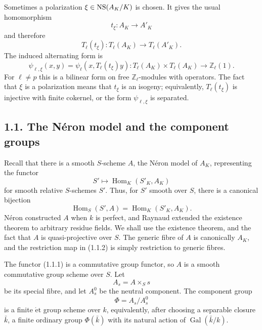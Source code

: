 \documentclass[11pt]{article}
\providecommand{\Gal}{\operatorname{Gal}}
\providecommand{\Z}{\mathbb Z}
\providecommand{\etale}{\mathrm{\acute et}}
\providecommand{\Hom}{\operatorname{Hom}}
\begin{document}
Sometimes a polarization \(\xi\in\operatorname{NS}(A_K/K)\) is chosen.  It gives the usual homomorphism
\begin{equation}\tag{1.0.5}
 t_\xi:A_K\longrightarrow A'_K
\end{equation}
and therefore
\begin{equation}\tag{1.0.6}
 T_\ell(t_\xi):T_\ell(A_K)\longrightarrow T_\ell(A'_K).
\end{equation}
The induced alternating form is
\begin{equation}\tag{1.0.7}
 \psi_{\ell,\xi}(x,y)=\psi_\ell(x,T_\ell(t_\xi)y):T_\ell(A_K)\times T_\ell(A_K)\longrightarrow \Z_\ell(1).
\end{equation}
For \(\ell\ne p\) this is a bilinear form on free \(\Z_\ell\)-modules with operators.  The fact that \(\xi\) is a polarization means that \(t_\xi\) is an isogeny; equivalently, \(T_\ell(t_\xi)\) is injective with finite cokernel, or the form \(\psi_{\ell,\xi}\) is separated.

\subsection*{1.1. The N\'eron model and the component groups}
Recall that there is a smooth \(S\)-scheme \(A\), the N\'eron model of \(A_K\), representing the functor
\begin{equation}\tag{1.1.1}
 S'\longmapsto \Hom_K(S'_K,A_K)
\end{equation}
for smooth relative \(S\)-schemes \(S'\).  Thus, for \(S'\) smooth over \(S\), there is a canonical bijection
\begin{equation}\tag{1.1.2}
 \Hom_S(S',A)=\Hom_K(S'_K,A_K).
\end{equation}
N\'eron constructed \(A\) when \(k\) is perfect, and Raynaud extended the existence theorem to arbitrary residue fields.  We shall use the existence theorem, and the fact that \(A\) is quasi-projective over \(S\).  The generic fibre of \(A\) is canonically \(A_K\), and the restriction map in (1.1.2) is simply restriction to generic fibres.

The functor (1.1.1) is a commutative group functor, so \(A\) is a smooth commutative group scheme over \(S\).  Let
\begin{equation}\tag{1.1.4}
 A_s=A\times_S s
\end{equation}
be its special fibre, and let \(A_s^0\) be the neutral component.  The component group
\begin{equation}\tag{1.1.5}
 \Phi=A_s/A_s^0
\end{equation}
is a finite \(\etale\) group scheme over \(k\), equivalently, after choosing a separable closure \(\bar k\), a finite ordinary group \(\Phi(\bar k)\) with its natural action of \(\Gal(\bar k/k)\).
\end{document}
